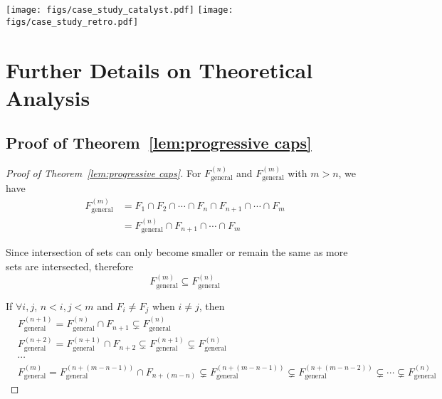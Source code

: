 \begin{figure*}[h]
    \centering
    \texttt{[image: figs/case\_study\_catalyst.pdf]}
    \texttt{[image: figs/case\_study\_retro.pdf]}\\[-7pt]
    \caption{Visualization of the cases generated by \method and the baseline on three reaction tasks.}
    \label{fig:case}
\end{figure*}

\section{Further Details on Theoretical Analysis}
\subsection{Proof of Theorem~\ref{lem:progressive caps}}
\label{sec:proof of lemma prog cap}
\begin{proof}[Proof of Theorem~\ref{lem:progressive caps}]
For $F_{\text{general}}^{(n)}$ and $F_{\text{general}}^{(m)}$ with $m>n$, we have
\begin{equation}
\begin{aligned}
    F_{\text{general}}^{(m)} &= F_1\cap F_2\cap\cdots\cap F_n\cap F_{n+1}\cap\cdots\cap F_m \\
    &=F_{\text{general}}^{(n)}\cap F_{n+1}\cap \cdots \cap F_m
\end{aligned}
\end{equation}

Since intersection of sets can only become smaller or remain the same as more sets are intersected, therefore
\begin{equation}
    F_{\text{general}}^{(m)} \subseteq F_{\text{general}}^{(n)}
\end{equation}

If $\forall i,j$, $n<i,j<m$ and $F_i\neq F_j$ when $i\neq j$, then
\begin{equation}
\begin{aligned}
    &F_{\text{general}}^{(n+1)} = F_{\text{general}}^{(n)}\cap F_{n+1}\subsetneq F_{\text{general}}^{(n)} \\
    &F_{\text{general}}^{(n+2)} = F_{\text{general}}^{(n+1)}\cap F_{n+2}\subsetneq F_{\text{general}}^{(n+1)} \subsetneq F_{\text{general}}^{(n)} \\
    & \cdots \\
    & F_{\text{general}}^{(m)} = F_{\text{general}}^{(n+(m-n-1))}\cap F_{n+(m-n)}\subsetneq F_{\text{general}}^{(n+(m-n-1))}\subsetneq F_{\text{general}}^{(n+(m-n-2))}\subsetneq \cdots \subsetneq F_{\text{general}}^{(n)}
\end{aligned}
\end{equation}
\end{proof}


